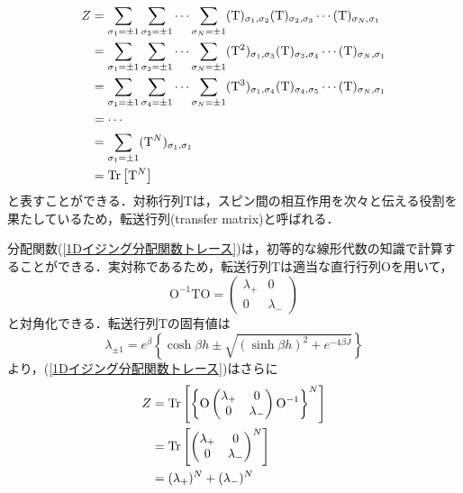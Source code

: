 \documentclass[a4paper,11pt]{jsreport}
\begin{document}
\begin{align}
  Z
   & = \sum_{\sigma_1 = \pm{1}}\sum_{\sigma_2 = \pm{1}} \cdots \sum_{\sigma_N = \pm{1}} (\mathrm{T})_{\sigma_1, \sigma_2} (\mathrm{T})_{\sigma_2, \sigma_3} \cdots (\mathrm{T})_{\sigma_N, \sigma_1} \notag   \\
   & = \sum_{\sigma_1 = \pm{1}}\sum_{\sigma_3 = \pm{1}} \cdots \sum_{\sigma_N = \pm{1}} (\mathrm{T}^2)_{\sigma_1, \sigma_3} (\mathrm{T})_{\sigma_3, \sigma_4} \cdots (\mathrm{T})_{\sigma_N, \sigma_1} \notag \\
   & = \sum_{\sigma_1 = \pm{1}}\sum_{\sigma_4 = \pm{1}} \cdots \sum_{\sigma_N = \pm{1}} (\mathrm{T}^3)_{\sigma_1, \sigma_4} (\mathrm{T})_{\sigma_4, \sigma_5} \cdots (\mathrm{T})_{\sigma_N, \sigma_1} \notag \\
   & = \cdots \notag                                                                                                                                                                                          \\
   & = \sum_{\sigma_1 = \pm{1}} (\mathrm{T}^N)_{\sigma_1, \sigma_1} \notag                                                                                                                                    \\
   & = \mathrm{Tr}\left[ \mathrm{T}^N \right] \label{1Dイジング分配関数トレース}
\end{align}
と表すことができる．対称行列$\mathrm{T}$は，スピン間の相互作用を次々と伝える役割を果たしているため，転送行列(transfer matrix)と呼ばれる．\par
分配関数(\ref{1Dイジング分配関数トレース})は，初等的な線形代数の知識で計算することができる．実対称であるため，転送行列$\mathrm{T}$は適当な直行行列$\mathrm{O}$を用いて，
\begin{equation}
  \mathrm{O}^{-1} \mathrm{T} \mathrm{O} =
  \begin{pmatrix}
    \lambda_{+} & 0           \\
    0           & \lambda_{-}
  \end{pmatrix}
\end{equation}
と対角化できる．転送行列$\mathrm{T}$の固有値は
\begin{equation}
  \lambda_{\pm{1}}
  = e^{\beta} \left\{ \cosh{\beta h} \pm{\sqrt{(\sinh{\beta h})^2 + e^{-4\beta J}}} \right\}
\end{equation}
より，(\ref{1Dイジング分配関数トレース})はさらに
\begin{align}
  Z
   & = \mathrm{Tr} \left[ \left\{ \mathrm{O}
  \begin{pmatrix}
      \lambda_{+} & 0           \\
      0           & \lambda_{-}
    \end{pmatrix} \mathrm{O}^{-1} \right\}^N \right] \notag   \\
   & = \mathrm{Tr} \left[
  \begin{pmatrix}
      \lambda_{+} & 0           \\
      0           & \lambda_{-}
    \end{pmatrix}^N \right] \notag                            \\
   & = (\lambda_{+})^N + (\lambda_{-})^N \label{1Dイジング分配関数}
\end{align}
\end{document}
